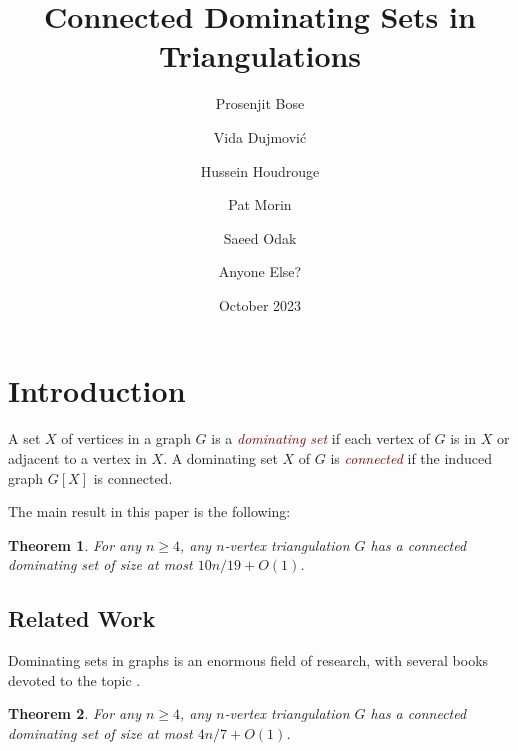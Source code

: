 \documentclass[12pt]{article}
\title{Connected Dominating Sets in Triangulations}
\author{Prosenjit Bose \and Vida Dujmović \and Hussein Houdrouge \and Pat Morin \and Saeed Odak \and Anyone Else?}
\date{October 2023}
\newtheorem{thm}{Theorem}
\newcommand{\defin}[1]{\emph{\textcolor{Maroon}{#1}}}
\newcommand{\pat}[1]{[\textcolor{red}{#1}]}
\begin{document}
\maketitle



\section{Introduction}

A set $X$ of vertices in a graph $G$ is a \defin{dominating set} if each vertex of $G$ is in $X$ or adjacent to a vertex in $X$.  A dominating set $X$ of $G$ is \defin{connected} if the induced graph $G[X]$ is connected.


The main result in this paper is the following:

\begin{thm}\label{main_result2}
  For any $n\ge 4$, any $n$-vertex triangulation $G$ has a connected dominating set of size at most $10n/19 + O(1)$.
\end{thm}

\subsection{Related Work}

Dominating sets in graphs is an enormous field of research, with several books  devoted to the topic \cite{haynes.hedetniemi.ea:domination,haynes.hedetniemi.ea:topics}.




\begin{thm}\label{main_result}
  For any $n\ge 4$, any $n$-vertex triangulation $G$ has a connected dominating set of size at most $4n/7 + O(1)$.
\end{thm}
\end{document}
